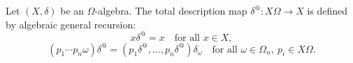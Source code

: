 Let $(X, \delta)$ be an $\Omega$-algebra. The total description map $\delta^@: X\Omega \longrightarrow X$ is defined by algebraic general recursion:
$$x\delta^@ = x \quad \text{for all } x \in X,$$
$$(p_1 \cdots p_n \omega)\delta^@ = (p_1\delta^@, \ldots, p_n\delta^@)\delta_\omega \quad \text{for all } \omega \in \Omega_n,\ p_i \in X\Omega.$$
